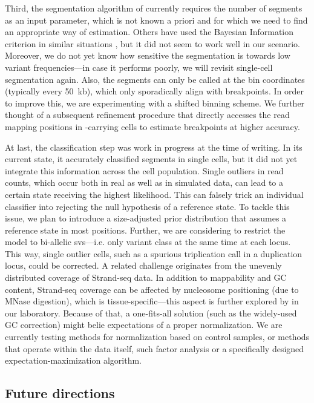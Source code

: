 Third, the segmentation algorithm of \mc currently requires the number of segments as an
input parameter, which is not known a priori and for which we need to find an
appropriate way of estimation.  Others have used the Bayesian Information
criterion in similar situations \citep{Huber2006}, but it did not seem to work well
in our scenario. Moreover, we do not yet know how sensitive the segmentation is
towards low variant frequencies---in case it performs poorly, we will revisit
single-cell segmentation again. Also, the segments can only be called at the bin
coordinates (typically every 50~kb), which only sporadically align with \sv
breakpoints. In order to improve this, we are experimenting with a shifted
binning scheme. We further thought of a subsequent refinement procedure that
directly accesses the read mapping positions in \sv-carrying cells to estimate
breakpoints at higher accuracy.

At last, the classification step was work in progress at the time of writing. In its current state, it
accurately classified segments in single cells, but it did not yet integrate
this information across the cell population. Single outliers in read counts,
which occur both in real as well as in simulated data, can lead to a certain
\sv state receiving the highest likelihood. This can falsely trick an individual
classifier into rejecting the null hypothesis of a reference state.
To tackle this issue, we plan to introduce a size-adjusted prior distribution that
assumes a reference state in most positions.
Further, we are considering to restrict the model to bi-allelic \acp{sv}---i.e.
only variant class at the same time at each locus. This way, single outlier
cells, such as a spurious triplication call in a duplication locus, could be
corrected. A related challenge originates from the unevenly distributed coverage
of Strand-seq data. In addition to mappability and GC content, Strand-seq
coverage can be affected by nucleosome positioning (due to MNase digestion),
which is tissue-specific---this aspect is further explored by \hyobin in our
laboratory. Because of that, a one-fits-all solution (such as the widely-used GC
correction) might belie expectations of a proper normalization. We are currently
testing methods for normalization based on control samples, or methods that operate within the data
itself, such factor analysis \citep{Stegle2012} or a specifically
designed expectation-maximization algorithm.



\subsection{Future directions}
\label{sec:mosaic_outlook}

